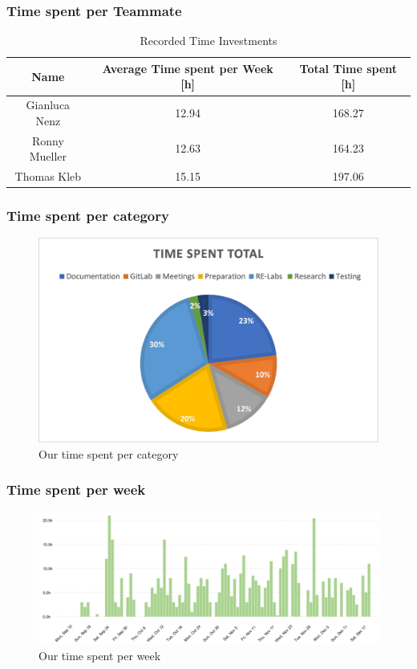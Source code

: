 \subsubsection*{Time spent per Teammate}
\begin{table}[H]
    \centering
    \begin{tabular}{||c c c||} 
        \hline
        Name & Average Time spent per Week [h] & Total Time spent [h]\\ [0.5ex] 
        \hline\hline
        Gianluca Nenz & 12.94 & 168.27 \\ 
        \hline
        Ronny Mueller & 12.63 & 164.23 \\
        \hline
        Thomas Kleb & 15.15 & 197.06 \\ 
        \hline
    \end{tabular}
    \caption{Recorded Time Investments}
    \label{time_ects_recorded}
\end{table}

\subsubsection*{Time spent per category}
\begin{figure}[H]
    \includegraphics[width=\linewidth, center]{resources/time-per-category.png}
    \caption{Our time spent per category}
    \label{fig:timepercategory}
\end{figure}

\subsubsection*{Time spent per week}
\begin{figure}[H]
    \includegraphics[width=\linewidth, center]{resources/time-per-week.png}
    \caption{Our time spent per week}
    \label{fig:timeperweek}
\end{figure}

